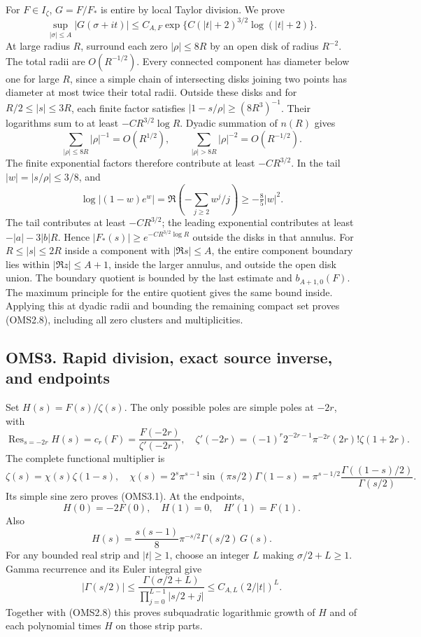 For \(F\in I_\zeta\), \(G=F/F_*\) is entire by local Taylor division. We
prove \[
\sup_{|\sigma|\le A}|G(\sigma+it)|
\le C_{A,F}\exp\{C(|t|+2)^{3/2}\log(|t|+2)\}.
\tag{OMS2.8}
\] At large radius \(R\), surround each zero \(|\rho|\le8R\) by an open
disk of radius \(R^{-2}\). The total radii are \(O(R^{-1/2})\). Every
connected component has diameter below one for large \(R\), since a
simple chain of intersecting disks joining two points has diameter at
most twice their total radii. Outside these disks and for
\(R/2\le|s|\le3R\), each finite factor satisfies
\(|1-s/\rho|\ge(8R^3)^{-1}\). Their logarithms sum to at least
\(-CR^{3/2}\log R\). Dyadic summation of \(n(R)\) gives \[
\sum_{|\rho|\le8R}|\rho|^{-1}=O(R^{1/2}),\qquad
\sum_{|\rho|>8R}|\rho|^{-2}=O(R^{-1/2}).
\] The finite exponential factors therefore contribute at least
\(-CR^{3/2}\). In the tail \(|w|=|s/\rho|\le3/8\), and \[
\log|(1-w)e^w|
=\Re(-\sum_{j\ge2}w^j/j)\ge-\tfrac85|w|^2.
\] The tail contributes at least \(-CR^{3/2}\); the leading exponential
contributes at least \(-|a|-3|b|R\). Hence
\(|F_*(s)|\ge e^{-CR^{3/2}\log R}\) outside the disks in that annulus.
For \(R\le|s|\le2R\) inside a component with \(|\Re s|\le A\), the
entire component boundary lies within \(|\Re z|\le A+1\), inside the
larger annulus, and outside the open disk union. The boundary quotient
is bounded by the last estimate and \(b_{A+1,0}(F)\). The maximum
principle for the entire quotient gives the same bound inside. Applying
this at dyadic radii and bounding the remaining compact set proves
(OMS2.8), including all zero clusters and multiplicities.

\subsection{OMS3. Rapid division, exact source inverse, and
endpoints}\label{oms3.-rapid-division-exact-source-inverse-and-endpoints}

Set \(H(s)=F(s)/\zeta(s)\). The only possible poles are simple poles at
\(-2r\), with \[
\operatorname{Res}_{s=-2r}H(s)=c_r(F)=\frac{F(-2r)}{\zeta'(-2r)},\quad
\zeta'(-2r)=(-1)^r2^{-2r-1}\pi^{-2r}(2r)!\zeta(1+2r).
\tag{OMS3.1}
\] The complete functional multiplier is \[
\zeta(s)=\chi(s)\zeta(1-s),\quad
\chi(s)=2^s\pi^{s-1}\sin(\pi s/2)\Gamma(1-s)
=\pi^{s-1/2}\frac{\Gamma((1-s)/2)}{\Gamma(s/2)}.
\tag{OMS3.2}
\] Its simple sine zero proves (OMS3.1). At the endpoints, \[
H(0)=-2F(0),\quad H(1)=0,\quad H'(1)=F(1).
\tag{OMS3.3}
\] Also \[
H(s)=\frac{s(s-1)}8\pi^{-s/2}\Gamma(s/2)\,G(s).
\tag{OMS3.4}
\] For any bounded real strip and \(|t|\ge1\), choose an integer \(L\)
making \(\sigma/2+L\ge1\). Gamma recurrence and its Euler integral give
\[
|\Gamma(s/2)|\le
\frac{\Gamma(\sigma/2+L)}{\prod_{j=0}^{L-1}|s/2+j|}
\le C_{A,L}(2/|t|)^L.
\] Together with (OMS2.8) this proves subquadratic logarithmic growth of
\(H\) and of each polynomial times \(H\) on those strip parts.

